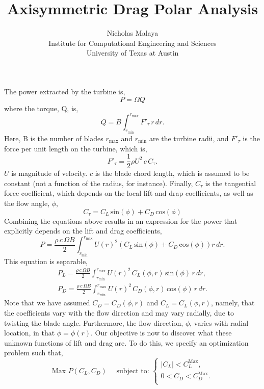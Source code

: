 \documentclass{article}
\title{\bf{Axisymmetric Drag Polar Analysis}}
\author{Nicholas Malaya \\ Institute for Computational Engineering and Sciences \\ University of Texas at Austin} \date{}
\begin{document}
\maketitle

\newpage

The power extracted by the turbine is, 
\begin{equation}
 P = \Omega Q
\end{equation}
where the torque, Q, is, 
\begin{equation}
 Q = B \int_{r_{\text{min}}}^{r_{\text{max}}} F'_{\tau}\, r\, dr.
\end{equation}
Here, B is the number of blades $r_{\text{max}}$ and $r_{\text{min}}$
are the turbine radii, and $F'_{\tau}$ is the force per unit
length on the turbine, which is, 
\begin{equation}
 F'_{\tau} = \frac{1}{2}\rho U^2 \, c \, C_{\tau}.
\end{equation}
$U$ is magnitude of velocity. $c$ is the blade chord
length, which is assumed to be constant (not a function of the radius,
for instance). Finally, $C_{\tau}$ is the tangential force coefficient,
which depends on the local lift and drap coefficients, as well as the
flow angle, $\phi$, 
\begin{equation}
 C_{\tau} = C_L \,\text{sin}(\phi) + C_D \,\text{cos}(\phi)
\end{equation}
Combining the equations above results in an expression for the power
that explicitly depends on the lift and drag coefficients, 
\begin{equation*}
 P = \frac{\rho\, c\, \Omega B}{2}
  \int_{r_{\text{min}}}^{r_{\text{max}}} U(r)^2 \left(C_L
						     \,\text{sin}(\phi)
						     + C_D
						     \,\text{cos}(\phi)
						    \right) r\,dr. 
\end{equation*}
This equation is separable, 
\begin{align}
 P_L = \frac{\rho\, c\, \Omega B}{2}
  \int_{r_{\text{min}}}^{r_{\text{max}}} U(r)^2 \, C_L(\phi,r)
 \,\text{sin}(\phi)\, r\,dr,  \label{lift} \\
 P_D = \frac{\rho\, c\, \Omega B}{2}
  \int_{r_{\text{min}}}^{r_{\text{max}}} U(r)^2 \, C_D(\phi,r) \,\text{cos}(\phi)\, r\,dr. \label{drag}
\end{align}
Note that we have assumed $C_D = C_D(\phi,r)$ and $C_L = C_L(\phi,r)$,
namely, that the coefficients vary with the flow direction and may vary
radially, due to twisting the blade angle. Furthermore, the flow
direction, $\phi$, varies with radial location, in that $\phi=\phi(r)$. 
Our objective is now to discover what these unknown functions of lift
and drag are. To do this, we specify an optimization problem such that, 
\begin{equation*} 
 \text{Max } P(C_L,C_D) \quad \text{ subject to: }
  \begin{cases}
   |C_L| < C_L^{\text{Max}}, \\
   0 < C_D < C_D^{\text{Max}}. \\
  \end{cases}
\end{equation*}
\end{document}
